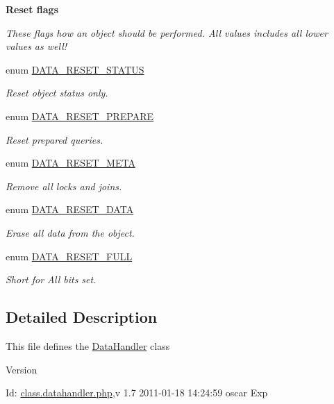 \begin{Indent}{\bf Reset flags}\par
{\em \label{_amgrp143448a659afeaa8616ca6e3acdb751b}
 These flags how an object should be performed. All values includes all lower values as well! }\begin{DoxyCompactItemize}
\item 
enum \hyperlink{class_8datahandler_8php_a9266811d651cb3ff8c5fdf00111e677b}{DATA\_\-RESET\_\-STATUS} 
\begin{DoxyCompactList}\small\item\em Reset object status only. \item\end{DoxyCompactList}\item 
enum \hyperlink{class_8datahandler_8php_a19a99423705b41e563424ae76d7fe184}{DATA\_\-RESET\_\-PREPARE} 
\begin{DoxyCompactList}\small\item\em Reset prepared queries. \item\end{DoxyCompactList}\item 
enum \hyperlink{class_8datahandler_8php_a3ce9f928f9ba75096925bd4157246bbb}{DATA\_\-RESET\_\-META} 
\begin{DoxyCompactList}\small\item\em Remove all locks and joins. \item\end{DoxyCompactList}\item 
enum \hyperlink{class_8datahandler_8php_a7c6305f5e748976aa75d367420a408ea}{DATA\_\-RESET\_\-DATA} 
\begin{DoxyCompactList}\small\item\em Erase all data from the object. \item\end{DoxyCompactList}\item 
enum \hyperlink{class_8datahandler_8php_a2a28429433990da242faa223d5a49f0a}{DATA\_\-RESET\_\-FULL} 
\begin{DoxyCompactList}\small\item\em Short for All bits set. \item\end{DoxyCompactList}\end{DoxyCompactItemize}
\end{Indent}


\subsection{Detailed Description}
This file defines the \hyperlink{classDataHandler}{DataHandler} class \begin{DoxyVersion}{Version}

\end{DoxyVersion}
\begin{DoxyParagraph}{Id:}
\hyperlink{class_8datahandler_8php}{class.datahandler.php},v 1.7 2011-\/01-\/18 14:24:59 oscar Exp 
\end{DoxyParagraph}


